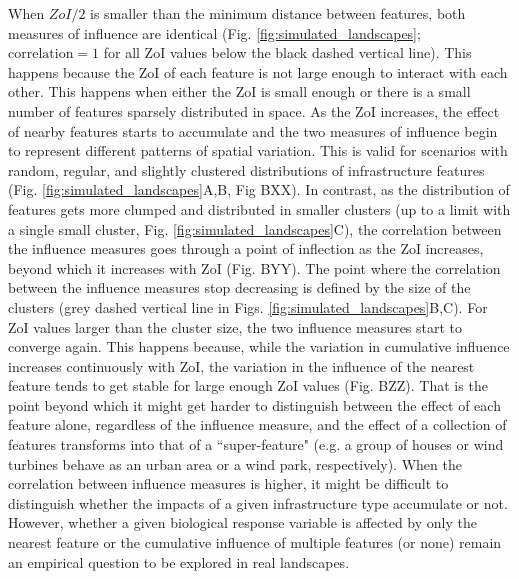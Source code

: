 \documentclass[titlepage]{article}
\begin{document}
When $ZoI/2$ is smaller than the minimum distance between features, both measures of influence are identical (Fig. \ref{fig:simulated_landscapes}; $\text{correlation} = 1$ for all ZoI values below the black dashed vertical line). This happens because the ZoI of each feature is not large enough to interact with each other. This happens when either the ZoI is small enough or  there is a small number of features sparsely distributed in space. As the ZoI increases, the effect of nearby features starts to accumulate and the two measures of influence begin to represent different patterns of spatial variation. This is valid for scenarios with random, regular, and slightly clustered distributions of infrastructure features (Fig. \ref{fig:simulated_landscapes}A,B, Fig BXX). In contrast, as the distribution of features gets more clumped and distributed in smaller clusters (up to a limit with a single small cluster, Fig. \ref{fig:simulated_landscapes}C), the correlation between the influence measures goes through a point of inflection as the ZoI increases, beyond which it increases with ZoI (Fig. BYY). The point where the correlation between the influence measures stop decreasing is defined by the size of the clusters (grey dashed vertical line in Figs. \ref{fig:simulated_landscapes}B,C). For ZoI values larger than the cluster size, the two influence measures start to converge again. This happens because, while the variation in cumulative influence increases continuously with ZoI, the variation in the influence of the nearest feature tends to get stable for large enough ZoI values (Fig. BZZ). That is the point beyond which it might get harder to distinguish between the effect of each feature alone, regardless of the influence measure, and the effect of a collection of features transforms into that of a ``super-feature" (e.g. a group of houses or wind turbines behave as an urban area or a wind park, respectively). 
When the correlation between influence measures is higher, it might be difficult to distinguish whether the impacts of a given infrastructure type accumulate or not. 
However, whether a given biological response variable is affected by only the nearest feature or the cumulative influence of multiple features (or none) remain an empirical question to be explored in real landscapes. 
\end{document}
